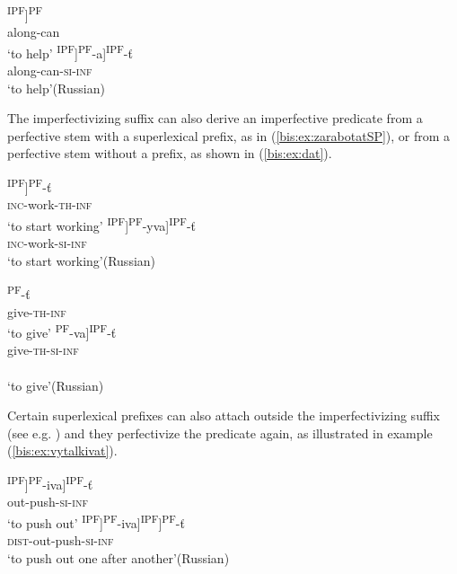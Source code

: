 \documentclass[output=paper]{langscibook}
\begin{document}
\ex\label{bis:ex:pomoc}
\ea\label{bis:ex:pomocA} \gll [po-[moč’]\textsuperscript{IPF}]\textsuperscript{PF} \\ 
along-can \\
\glt ‘to help’
\ex\label{bis:ex:pomagatB} \gll [[po-[mag]\textsuperscript{IPF}]\textsuperscript{PF}-a]\textsuperscript{IPF}-ť \\  
along-can-\textsc{si}-\textsc{inf} \\
\glt ‘to help’\hfill (Russian)
\z\z

\noindent The imperfectivizing suffix can also derive an imperfective predicate from a perfective stem with a superlexical prefix, as in (\ref{bis:ex:zarabotatSP}), or from a perfective stem without a prefix, as shown in (\ref{bis:ex:dat}).

\ea\label{bis:ex:zarabotatSP}
\ea\label{bis:ex:zarabotatSPA} \gll [za-[rabot-a]\textsuperscript{IPF}]\textsuperscript{PF}-ť \\ 
\textsc{inc}-work-\textsc{th}-\textsc{inf} \\
\glt ‘to start working’
\ex\label{bis:ex:zarabatyvatSPB} \gll [[za-[rabat]\textsuperscript{IPF}]\textsuperscript{PF}-yva]\textsuperscript{IPF}-ť \\  
\textsc{inc}-work-\textsc{si}-\textsc{inf} \\
\glt ‘to start working’\hfill (Russian)
\z

\ex\label{bis:ex:dat}
\ea\label{bis:ex:datA} \gll [d-a]\textsuperscript{PF}-ť \\ 
give-\textsc{th}-\textsc{inf} \\
\glt ‘to give’
\ex\label{bis:ex:davatB} \gll [[d-a]\textsuperscript{PF}-va]\textsuperscript{IPF}-ť \\  
give-\textsc{th}-\textsc{si}-\textsc{inf} \\ \\
\glt ‘to give’\hfill (Russian)
\z\z

\noindent Certain superlexical prefixes can also attach outside the imperfectivizing suffix (see e.g. \citealt{Ramchand2004,Gehrke2008b,Tatevosov2013,Szucsich2014,KlimekJankowska.Błaszczak2021,KlimekJankowska.Błaszczak2022}) and they perfectivize the predicate again, as illustrated in example (\ref{bis:ex:vytalkivat}).

\ea\label{bis:ex:vytalkivat}
\ea\label{bis:ex:vytalkivatA} \gll 
[[vy-[talk]\textsuperscript{IPF}]\textsuperscript{PF}-iva]\textsuperscript{IPF}-ť \\
out-push-\textsc{si}-\textsc{inf} \\
\glt ‘to push out’
\ex\label{bis:ex:povytalkivatB} \gll [po-[[vy-[talk]\textsuperscript{IPF}]\textsuperscript{PF}-iva]\textsuperscript{IPF}]\textsuperscript{PF}-ť \\  
\textsc{dist}-out-push-\textsc{si}-\textsc{inf} \\
\glt ‘to push out one after another’\hfill (Russian)
\z\z
\end{document}
